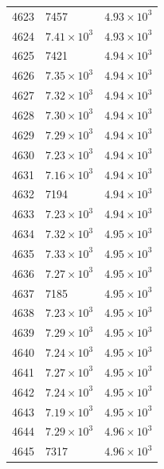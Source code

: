 \begin{table}[H]
\begin{tabular}{lll}
4623 & 7457 & $\displaystyle 4.93 \times 10^{3}$ \\
4624 & $\displaystyle 7.41 \times 10^{3}$ & $\displaystyle 4.93 \times 10^{3}$ \\
4625 & 7421 & $\displaystyle 4.94 \times 10^{3}$ \\
4626 & $\displaystyle 7.35 \times 10^{3}$ & $\displaystyle 4.94 \times 10^{3}$ \\
4627 & $\displaystyle 7.32 \times 10^{3}$ & $\displaystyle 4.94 \times 10^{3}$ \\
4628 & $\displaystyle 7.30 \times 10^{3}$ & $\displaystyle 4.94 \times 10^{3}$ \\
4629 & $\displaystyle 7.29 \times 10^{3}$ & $\displaystyle 4.94 \times 10^{3}$ \\
4630 & $\displaystyle 7.23 \times 10^{3}$ & $\displaystyle 4.94 \times 10^{3}$ \\
4631 & $\displaystyle 7.16 \times 10^{3}$ & $\displaystyle 4.94 \times 10^{3}$ \\
4632 & 7194 & $\displaystyle 4.94 \times 10^{3}$ \\
4633 & $\displaystyle 7.23 \times 10^{3}$ & $\displaystyle 4.94 \times 10^{3}$ \\
4634 & $\displaystyle 7.32 \times 10^{3}$ & $\displaystyle 4.95 \times 10^{3}$ \\
4635 & $\displaystyle 7.33 \times 10^{3}$ & $\displaystyle 4.95 \times 10^{3}$ \\
4636 & $\displaystyle 7.27 \times 10^{3}$ & $\displaystyle 4.95 \times 10^{3}$ \\
4637 & 7185 & $\displaystyle 4.95 \times 10^{3}$ \\
4638 & $\displaystyle 7.23 \times 10^{3}$ & $\displaystyle 4.95 \times 10^{3}$ \\
4639 & $\displaystyle 7.29 \times 10^{3}$ & $\displaystyle 4.95 \times 10^{3}$ \\
4640 & $\displaystyle 7.24 \times 10^{3}$ & $\displaystyle 4.95 \times 10^{3}$ \\
4641 & $\displaystyle 7.27 \times 10^{3}$ & $\displaystyle 4.95 \times 10^{3}$ \\
4642 & $\displaystyle 7.24 \times 10^{3}$ & $\displaystyle 4.95 \times 10^{3}$ \\
4643 & $\displaystyle 7.19 \times 10^{3}$ & $\displaystyle 4.95 \times 10^{3}$ \\
4644 & $\displaystyle 7.29 \times 10^{3}$ & $\displaystyle 4.96 \times 10^{3}$ \\
4645 & 7317 & $\displaystyle 4.96 \times 10^{3}$ \\

\end{tabular}
\end{table}
